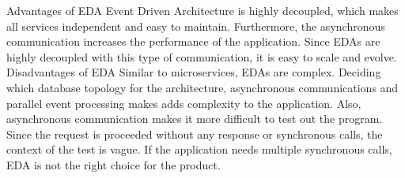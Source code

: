Advantages of EDA
Event Driven Architecture is highly decoupled, which makes all services independent and easy to maintain. Furthermore, the asynchronous communication increases the performance of the application. Since EDAs are highly decoupled with this type of communication, it is easy to scale and evolve. 
Disadvantages of EDA
Similar to microservices, EDAs are complex. Deciding which database topology for the architecture, asynchronous communications and parallel event processing makes adds complexity to the application. Also, asynchronous communication makes it more difficult to test out the program. Since the request is proceeded without any response or synchronous calls, the context of the test is vague. If the application needs multiple synchronous calls, EDA is not the right choice for the product. 

